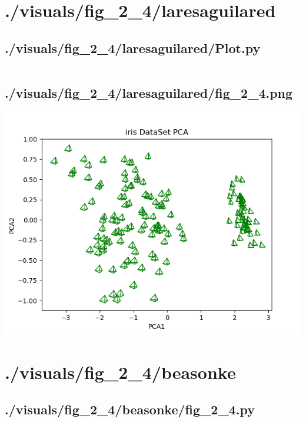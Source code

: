 \documentclass{report}
\begin{document}
    \section{./visuals/fig\_2\_4/laresaguilared}
    \subsection{./visuals/fig\_2\_4/laresaguilared/Plot.py}
    \inputminted[breaklines=true]{python}{.././visuals/fig_2_4/laresaguilared/Plot.py}
    \subsection{./visuals/fig\_2\_4/laresaguilared/fig\_2\_4.png}
    \includegraphics[width=\textwidth]{.././visuals/fig_2_4/laresaguilared/fig_2_4.png}
    \pagebreak
    \section{./visuals/fig\_2\_4/beasonke}
    \subsection{./visuals/fig\_2\_4/beasonke/fig\_2\_4.py}
    \inputminted[breaklines=true]{python}{.././visuals/fig_2_4/beasonke/fig_2_4.py}
\end{document}
